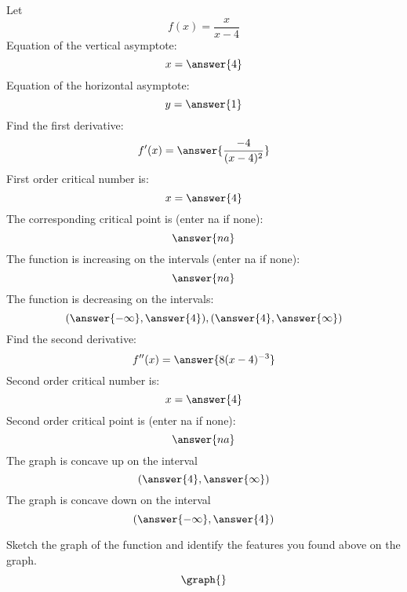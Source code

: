 \documentclass{ximera}
\begin{document}
\begin{problem}\label{prob:240quiz12prob4}
Let $$f(x)=\frac{x}{x-4}$$
Equation of the vertical asymptote:
$$x=\answer{4}$$
Equation of the horizontal asymptote:
$$y=\answer{1}$$
Find the first derivative:
$$f'(x)=\answer{\frac{-4}{(x-4)^2}}$$
First order critical number is:
$$x=\answer{4}$$
The corresponding critical point is (enter na if none):
$$\answer{na}$$
The function is increasing on the intervals (enter na if none):
$$\answer{na}$$
The function is decreasing on the intervals:
$$(\answer{-\infty}, \answer{4}), (\answer{4},\answer{\infty})$$
Find the second derivative:
$$f''(x)=\answer{8(x-4)^{-3}}$$
Second order critical number is:
$$x=\answer{4}$$
Second order critical point is (enter na if none):
$$\answer{na}$$
The graph is concave up on the interval
$$(\answer{4}, \answer{\infty})$$
The graph is concave down on the interval
$$(\answer{-\infty}, \answer{4})$$

Sketch the graph of the function and identify the features you found above on the graph.
\[
\graph{}
\]
\end{problem}
\end{document}
